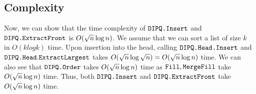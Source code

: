 \subsection{Complexity}
Now, we can show that the time complexity of $\texttt{DIPQ.Insert}$ and $\texttt{DIPQ.ExtractFront}$ is $O({\sqrt{n}} \log n)$.
We assume that we can sort a list of size $k$ in $O(k log k)$ time.
Upon insertion into the head, calling $\texttt{DIPQ.Head}\texttt{.Insert}$ and $\texttt{DIPQ.Head}.\texttt{ExtractLargest}$ takes $O({\sqrt{n}} \log {\sqrt{n}}) = O({\sqrt{n}} \log n)$ time.
We can also see that $\texttt{DIPQ.Order}$ takes $O({\sqrt{n}} \log n)$ time as $\texttt{Fill}, \texttt{MergeFill}$ take $O({\sqrt{n}} \log n)$ time.
Thus, both $\texttt{DIPQ.Insert}$ and $\texttt{DIPQ.ExtractFront}$ take $O({\sqrt{n}} \log n)$ time.



